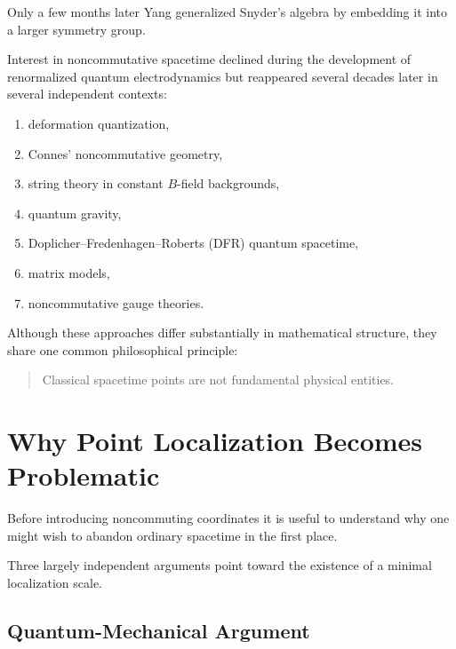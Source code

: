 Only a few months later Yang generalized Snyder's algebra by embedding it into
a larger symmetry group.

Interest in noncommutative spacetime declined during the development of
renormalized quantum electrodynamics but reappeared several decades later in
several independent contexts:

\begin{enumerate}

\item deformation quantization,

\item Connes' noncommutative geometry,

\item string theory in constant $B$-field backgrounds,

\item quantum gravity,

\item Doplicher--Fredenhagen--Roberts (DFR) quantum spacetime,

\item matrix models,

\item noncommutative gauge theories.

\end{enumerate}

Although these approaches differ substantially in mathematical structure, they
share one common philosophical principle:

\begin{quote}
Classical spacetime points are not fundamental physical entities.
\end{quote}


\section{Why Point Localization Becomes Problematic}

Before introducing noncommuting coordinates it is useful to understand why one
might wish to abandon ordinary spacetime in the first place.

Three largely independent arguments point toward the existence of a minimal
localization scale.


\subsection{Quantum-Mechanical Argument}

